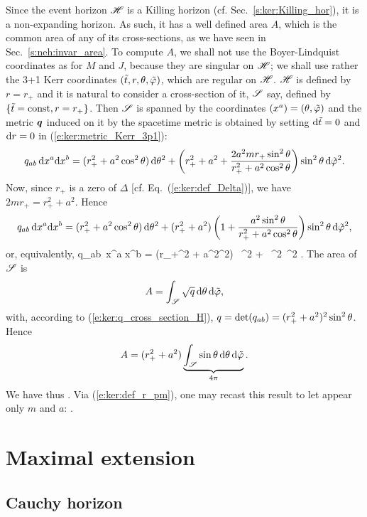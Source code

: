 Since the event horizon $\mathscr{H}$ is a Killing horizon (cf. Sec.~\ref{s:ker:Killing_hor}),
it is a non-expanding horizon. As such, it has a well defined
area $A$, which is the
common area of any of its cross-sections, as we have seen in
Sec.~\ref{s:neh:invar_area}. To compute $A$, we shall not use the Boyer-Lindquist
coordinates as for $M$ and $J$, because they are singular on $\mathscr{H}$; we shall
use rather the 3+1 Kerr coordinates $({\tilde t}, r, \theta,{\tilde\varphi})$, which are regular
on $\mathscr{H}$. $\mathscr{H}$ is defined by $r=r_+$ and it is natural to consider a
cross-section of it, $\mathscr{S}$ say, defined by $\{{\tilde t}=\mathrm{const}, r=r_+\}$.
Then $\mathscr{S}$ is spanned by the coordinates $(x^a) = (\theta,{\tilde\varphi})$ and the metric $\bm{q}$
induced on it by the spacetime metric is obtained by setting
$\mathrm{d}{\tilde t}=0$ and $\mathrm{d} r = 0$ in (\ref{e:ker:metric_Kerr_3p1}):
\[
        q_{ab}\,  \mathrm{d} x^a \mathrm{d} x^b =
   (r_+^2 + a^2\cos^2\theta)\, \mathrm{d} \theta^2
    + \left( r_+^2 + a^2 + \frac{2 a^2 m r_+ \sin^2\theta}{r_+^2 + a^2\cos^2\theta} \right)
    \sin^2\theta \, \mathrm{d} {\tilde\varphi}^2 .
\]
Now, since $r_+$ is a zero of $\Delta$ [cf. Eq.~(\ref{e:ker:def_Delta})],
we have $2 m r_+ = r_+^2 + a^2 $. Hence
\[
        q_{ab}\,  \mathrm{d} x^a \mathrm{d} x^b =
  (r_+^2 + a^2\cos^2\theta) \, \mathrm{d} \theta^2
    + (r_+^2 + a^2)\left( 1 + \frac{a^2 \sin^2\theta}{r_+^2 + a^2\cos^2\theta} \right)
    \sin^2\theta \, \mathrm{d} {\tilde\varphi}^2 ,
\]
or, equivalently,
\be \label{e:ker:q_cross_section_H}
        q_{ab}\,  \D x^a \D x^b =
  (r_+^2 + a^2\cos^2\th) \, \D \th^2
    + \,
    \sin^2\th \, \D \tph^2 .
\ee
The area of $\mathscr{S}$ is
\[
    A = \int_{\mathscr{S}} \sqrt{q} \, \mathrm{d}\theta\, \mathrm{d}{\tilde\varphi} ,
\]
with, according to (\ref{e:ker:q_cross_section_H}),
$q = \det (q_{ab}) = (r_+^2 + a^2)^2 \sin^2\theta$. Hence
\[
    A = (r_+^2 + a^2) \underbrace{\int_{\mathscr{S}} \sin\theta \, \mathrm{d}\theta\, \mathrm{d}{\tilde\varphi}}_{4\pi} .
\]
We have thus
\be
     .
\ee
Via (\ref{e:ker:def_r_pm}),
one may recast this result to let appear only $m$ and $a$:
\be
     .
\ee








\section{Maximal extension}

\subsection{Cauchy horizon}
